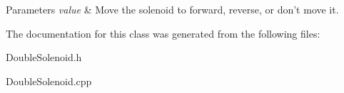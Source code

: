 \begin{DoxyParams}{Parameters}
{\em value} & Move the solenoid to forward, reverse, or don't move it. \\
\hline
\end{DoxyParams}


The documentation for this class was generated from the following files:\begin{DoxyCompactItemize}
\item 
DoubleSolenoid.h\item 
DoubleSolenoid.cpp\end{DoxyCompactItemize}
